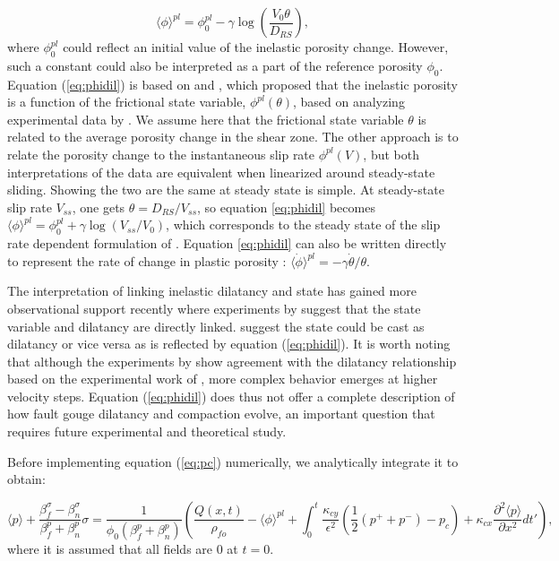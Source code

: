 \documentclass[draft]{agujournal2019}
\begin{document}
\begin{equation}
    \langle \phi \rangle^{pl} = \phi_0^{pl} -  \gamma \log \left( \frac{V_0 \theta}{D_{RS}} \right),
    \label{eq:phidil}
\end{equation}
where $\phi_0^{pl}$ could reflect an initial value of the inelastic porosity change. However, such a constant could also be interpreted as a part of the reference porosity $\phi_0$.
Equation (\ref{eq:phidil}) is based on  and , which proposed that the inelastic porosity is a function of the frictional state variable, $\phi^{pl} (\theta)$, based on analyzing experimental data by . We assume here that the frictional state variable $\theta$ is related to the average porosity change in the shear zone. The other approach is to relate the porosity change to the instantaneous slip rate $\phi^{pl} (V)$, but both interpretations of the  data are equivalent when linearized around steady-state sliding. Showing the two are the same at steady state is simple. At steady-state slip rate $V_{ss}$, one gets $\theta = D_{RS}/V_{ss}$, so equation \ref{eq:phidil} becomes  $\langle \phi \rangle^{pl} = \phi_0^{pl} +  \gamma \log (V_{ss}/V_0)$, which corresponds to the steady state of the slip rate dependent formulation of . Equation \ref{eq:phidil} can also be written directly to represent the rate of change in plastic porosity \cite{segall2010}: $\langle \dot{\phi} \rangle^{pl} = - \gamma \dot{\theta}/\theta $.

The interpretation of linking inelastic dilatancy and state has gained more observational support recently where experiments by  suggest that the state variable and dilatancy are directly linked.  suggest the state could be cast as dilatancy or vice versa as is reflected by equation (\ref{eq:phidil}). It is worth noting that although the experiments by  show agreement with the  dilatancy relationship based on the experimental work of , more complex behavior emerges at higher velocity steps. Equation (\ref{eq:phidil}) does thus not offer a complete description of how fault gouge dilatancy and compaction evolve, an important question that requires future experimental and theoretical study.

Before implementing equation (\ref{eq:pc}) numerically, we analytically integrate it to obtain:

\begin{equation}
      \langle {p} \rangle + \frac{\beta_f^\sigma - \beta_n^{\sigma}}{\beta_f^p + \beta_n^p } {\sigma}    = \frac{1}{\phi_0(\beta_f^p + \beta_n^p)} \left( \frac{{Q}(x,t)}{\rho_{fo}}  - \langle {\phi} \rangle^{pl} +  \int_0^t \frac{\kappa_{cy}}{\epsilon^2} (\frac{1}{2}(p^+ + p^-) - p_c) + \kappa_{cx} \frac{\partial^2 \langle p \rangle}{\partial x^2} dt' \right),
     \label{eq:pcI}
\end{equation}	
where it is assumed that all fields are 0 at $t=0$.
\end{document}
